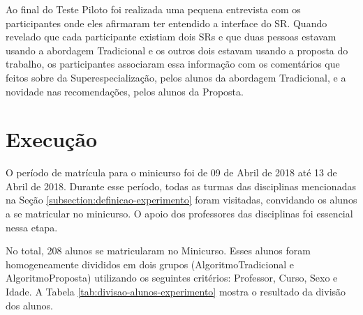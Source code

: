 Ao final do Teste Piloto foi realizada uma pequena entrevista com os participantes onde eles afirmaram ter entendido
a interface do SR. Quando revelado que cada participante existiam dois SRs e que duas pessoas estavam usando a abordagem
Tradicional e os outros dois estavam usando a proposta do trabalho, os participantes associaram essa informação com os
comentários que feitos sobre da Superespecialização, pelos alunos da abordagem Tradicional, e a novidade nas recomendações,
pelos alunos da Proposta.

\section{Execução}\label{section:execucao-experimento}

O período de matrícula para o minicurso foi de 09 de Abril de 2018 até 13 de Abril de 2018. Durante esse período, todas
as turmas das disciplinas mencionadas na Seção \ref{subsection:definicao-experimento} foram visitadas, convidando os
alunos a se matricular no minicurso. O apoio dos professores das disciplinas foi essencial nessa etapa.

No total, 208 alunos se matricularam no Minicurso. Esses alunos foram homogeneamente divididos em dois grupos
(AlgoritmoTradicional e AlgoritmoProposta) utilizando os seguintes critérios: Professor, Curso, Sexo e Idade. A
Tabela \ref{tab:divisao-alunos-experimento} mostra o resultado da divisão dos alunos.


